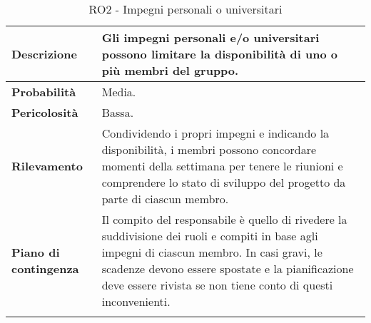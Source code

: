 \newpage
\begin{longtable}{ | l | p{10cm} | }
	\hline
	\textbf{Descrizione}          & Gli impegni personali e/o universitari possono limitare la disponibilità di uno o più membri del gruppo.                                                                                                                                                           \\
	\hline
	\textbf{Probabilità}          & Media.                                                                                                                                                                                                                                                             \\
	\hline
	\textbf{Pericolosità}         & Bassa.                                                                                                                                                                                                                                                             \\
	\hline
	\textbf{Rilevamento}          & Condividendo i propri impegni e indicando la disponibilità, i membri possono concordare momenti della settimana per tenere le riunioni e comprendere lo stato di sviluppo del progetto da parte di ciascun membro.                                                 \\
	\hline
	\textbf{Piano di contingenza} & Il compito del responsabile è quello di rivedere la suddivisione dei ruoli e compiti in base agli impegni di ciascun membro. In casi gravi, le scadenze devono essere spostate e la pianificazione deve essere rivista se non tiene conto di questi inconvenienti. \\
	\hline
	\caption{RO2 - Impegni personali o universitari}
	\label{table:2}
\end{longtable}

